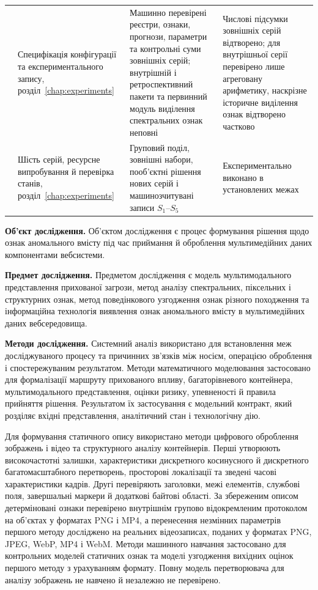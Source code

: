 \begin{longtable}{@{}>{\centering\arraybackslash}p{}p{}p{}p{}@{}}
7 & Специфікація конфігурації та експериментального запису, розділ~\ref{chap:experiments} & Машинно перевірені реєстри, ознаки, прогнози, параметри та контрольні суми зовнішніх серій; внутрішній і ретроспективний пакети та первинний модуль виділення спектральних ознак неповні & Числові підсумки зовнішніх серій відтворено; для внутрішньої серії перевірено лише агреговану арифметику, наскрізне історичне виділення ознак відтворено частково \\
8 & Шість серій, ресурсне випробування й перевірка станів, розділ~\ref{chap:experiments} & Груповий поділ, зовнішні набори, пооб’єктні рішення нових серій і машинозчитувані записи $S_1$--$S_5$ & Експериментально виконано в установлених межах \\
\end{longtable}

\textbf{Об’єкт дослідження.}
Об’єктом дослідження є процес формування рішення щодо ознак аномального вмісту під час приймання й оброблення мультимедійних даних компонентами вебсистеми.

\textbf{Предмет дослідження.}
Предметом дослідження є модель мультимодального представлення прихованої загрози, метод аналізу спектральних, піксельних і структурних ознак, метод поведінкового узгодження ознак різного походження та інформаційна технологія виявлення ознак аномального вмісту в мультимедійних даних вебсередовища.

\textbf{Методи дослідження.}
Системний аналіз використано для встановлення меж досліджуваного процесу та причинних зв’язків між носієм, операцією оброблення і спостережуваним результатом. Методи математичного моделювання застосовано для формалізації маршруту прихованого впливу, багаторівневого контейнера, мультимодального представлення, оцінки ризику, упевненості й правила прийняття рішення. Результатом їх застосування є модельний контракт, який розділяє вхідні представлення, аналітичний стан і технологічну дію.

Для формування статичного опису використано методи цифрового оброблення зображень і відео та структурного аналізу контейнерів. Перші утворюють високочастотні залишки, характеристики дискретного косинусного й дискретного багатомасштабного перетворень, просторові локалізації та зведені часові характеристики кадрів. Другі перевіряють заголовки, межі елементів, службові поля, завершальні маркери й додаткові байтові області. За збереженим описом детерміновані ознаки перевірено внутрішнім групово відокремленим протоколом на об’єктах у форматах PNG і MP4, а перенесення незмінних параметрів першого методу досліджено на реальних відеозаписах, поданих у форматах PNG, JPEG, WebP, MP4 і WebM. Методи машинного навчання застосовано для контрольних моделей статичних ознак та моделі узгодження вихідних оцінок першого методу з урахуванням формату. Повну модель перетворювача для аналізу зображень не навчено й незалежно не перевірено.

